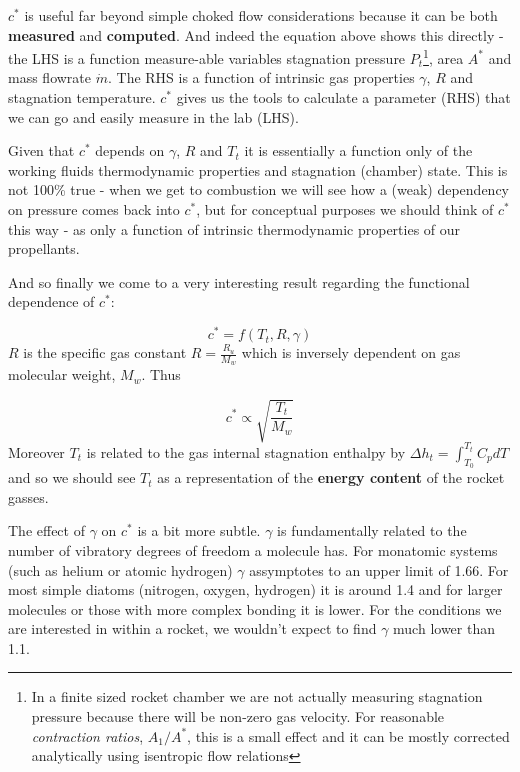 \documentclass[twocolumn]{memoir} %
\begin{document}
$c^*$ is useful far beyond simple choked flow considerations because
it can be both \textbf{measured} and \textbf{computed}. And indeed the
equation above shows this directly - the LHS is a function 
measure-able variables stagnation pressure $P_t$\footnote{In a finite sized rocket chamber we are not actually measuring stagnation pressure because there will be non-zero gas velocity.  For reasonable \emph{contraction ratios}, $A_1/A^*$, this is a small effect and it can be mostly corrected analytically using isentropic flow relations}, area $A^*$ and mass flowrate $\dot{m}$. The RHS is a
function of intrinsic gas properties $\gamma$, $R$ and stagnation
temperature. $c^*$ gives us the tools to calculate a parameter (RHS)
that we can go and easily measure in the lab (LHS).

Given that $c^*$ depends on $\gamma$, $R$ and $T_t$ it is essentially a function only of the working fluids thermodynamic properties and stagnation (chamber) state.  This is not 100\% true - when we get to combustion we will see how a (weak) dependency on pressure comes back into $c^*$, but for conceptual purposes we should think of $c^*$ this way - as only a function of intrinsic thermodynamic properties of our propellants.

And so finally we come to a very interesting result regarding the
functional dependence of $c^*$:

\begin{equation}c^* = f(T_t, R, \gamma)
\end{equation}
%
$R$ is the specific gas constant $R = \frac{R_u}{M_w}$ which is
inversely dependent on gas molecular weight, $M_w$. Thus

\begin{equation}c^* \propto \sqrt{\frac{T_t}{M_w}}
\end{equation}
%
Moreover $T_t$ is related to the gas internal stagnation enthalpy by
$\Delta h_t = \int_{T_0}^{T_t} C_p dT$ and so we should see $T_t$ as
a representation of the \textbf{energy content} of the rocket gasses.

The effect of $\gamma$ on $c^*$ is a bit more subtle. $\gamma$ is
fundamentally related to the number of vibratory degrees of freedom a
molecule has. For monatomic systems (such as helium or atomic hydrogen)
$\gamma$ assymptotes to an upper limit of 1.66. For most simple
diatoms (nitrogen, oxygen, hydrogen) it is around 1.4 and for larger
molecules or those with more complex bonding it is lower. For the
conditions we are interested in within a rocket, we wouldn't expect to
find $\gamma$ much lower than 1.1.
\end{document}

